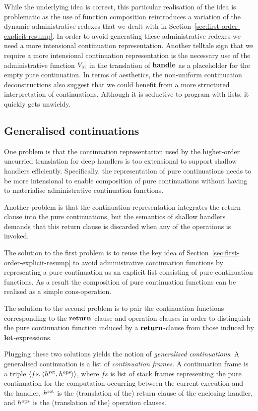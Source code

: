 \documentclass[12pt,phd,lfcs,twoside,openright,logo,leftchapter,normalheadings]{infthesis}
\theoremstyle{plain}
\theoremstyle{definition}
\begin{document}
While the underlying idea is correct, this particular realisation of
the idea is problematic as the use of function composition
reintroduces a variation of the dynamic administrative redexes that we
dealt with in Section~\ref{sec:first-order-explicit-resump}.
%
In order to avoid generating these administrative redexes we need a
more intensional continuation representation.
%
Another telltale sign that we require a more intensional continuation
representation is the necessary use of the administrative function
$V_\mathrm{id}$ in the translation of $\mathbf{handle}$ as a placeholder for the empty
pure continuation.
%
In terms of aesthetics, the non-uniform continuation deconstructions
also suggest that we could benefit from a more structured
interpretation of continuations.
%
Although it is seductive to program with lists, it quickly gets
unwieldy.

\subsection{Generalised continuations}
\label{sec:generalised-continuations}

One problem is that the continuation representation used by the
higher-order uncurried translation for deep handlers is too
extensional to support shallow handlers efficiently. Specifically, the
representation of pure continuations needs to be more intensional to
enable composition of pure continuations without having to materialise
administrative continuation functions.
%

Another problem is that the continuation representation integrates the
return clause into the pure continuations, but the semantics of
shallow handlers demands that this return clause is discarded when any
of the operations is invoked.

The solution to the first problem is to reuse the key idea of
Section~\ref{sec:first-order-explicit-resump} to avoid administrative
continuation functions by representing a pure continuation as an
explicit list consisting of pure continuation functions. As a result
the composition of pure continuation functions can be realised as a
simple cons-operation.
%

The solution to the second problem is to pair the continuation
functions corresponding to the $\mathbf{return}$-clause and operation clauses
in order to distinguish the pure continuation function induced by a
$\mathbf{return}$-clause from those induced by $\mathbf{let}$-expressions.
%

Plugging these two solutions yields the notion of \emph{generalised
  continuations}. A generalised continuation is a list of
\emph{continuation frames}. A continuation frame is a triple
$\langle fs, \langle h^{\mathrm{ret}}, h^{\mathrm{ops}} \rangle \rangle$, where $fs$ is list of stack
frames representing the pure continuation for the computation
occurring between the current execution and the handler, $h^{\mathrm{ret}}$ is
the (translation of the) return clause of the enclosing handler, and
$h^{\mathrm{ops}}$ is the (translation of the) operation clauses.
%
\end{document}
